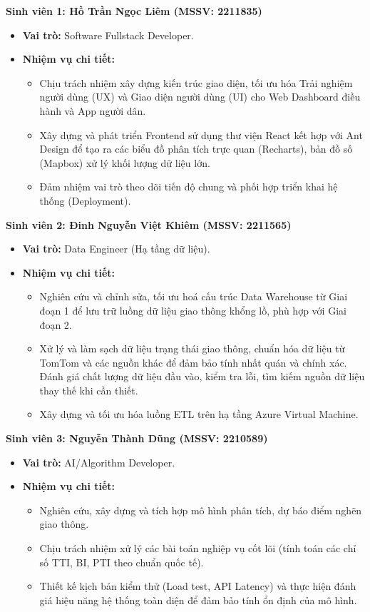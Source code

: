 \vspace{0.5cm}
\noindent\textbf{Sinh viên 1: Hồ Trần Ngọc Liêm (MSSV: 2211835)}
\begin{itemize}
    \item \textbf{Vai trò:} Software Fullstack Developer.
    \item \textbf{Nhiệm vụ chi tiết:}
    \begin{itemize}
        \item Chịu trách nhiệm xây dựng kiến trúc giao diện, tối ưu hóa Trải nghiệm người dùng (UX) và Giao diện người dùng (UI) cho Web Dashboard điều hành và App người dân.
        \item Xây dựng và phát triển Frontend sử dụng thư viện React kết hợp với Ant Design để tạo ra các biểu đồ phân tích trực quan (Recharts), bản đồ số (Mapbox) xử lý khối lượng dữ liệu lớn.
        \item Đảm nhiệm vai trò theo dõi tiến độ chung và phối hợp triển khai hệ thống (Deployment).
    \end{itemize}
\end{itemize}

\vspace{0.5cm}
\noindent\textbf{Sinh viên 2: Đinh Nguyễn Việt Khiêm (MSSV: 2211565)}
\begin{itemize}
    \item \textbf{Vai trò:} Data Engineer (Hạ tầng dữ liệu).
    \item \textbf{Nhiệm vụ chi tiết:}
    \begin{itemize}
        \item Nghiên cứu và chỉnh sửa, tối ưu hoá cấu trúc Data Warehouse từ Giai đoạn 1 để lưu trữ luồng dữ liệu giao thông khổng lồ, phù hợp với Giai đoạn 2.
        \item Xử lý và làm sạch dữ liệu trạng thái giao thông, chuẩn hóa dữ liệu từ TomTom và các nguồn khác để đảm bảo tính nhất quán và chính xác. Đánh giá chất lượng dữ liệu đầu vào, kiểm tra lỗi, tìm kiếm nguồn dữ liệu thay thế khi cần thiết.
        \item Xây dựng và tối ưu hóa luồng ETL trên hạ tầng Azure Virtual Machine.
    \end{itemize}
\end{itemize}

\vspace{0.5cm}
\noindent\textbf{Sinh viên 3: Nguyễn Thành Dũng (MSSV: 2210589)}
\begin{itemize}
    \item \textbf{Vai trò:} AI/Algorithm Developer.
    \item \textbf{Nhiệm vụ chi tiết:}
    \begin{itemize}
        \item Nghiên cứu, xây dựng và tích hợp mô hình phân tích, dự báo điểm nghẽn giao thông.
        \item Chịu trách nhiệm xử lý các bài toán nghiệp vụ cốt lõi (tính toán các chỉ số TTI, BI, PTI theo chuẩn quốc tế).
        \item Thiết kế kịch bản kiểm thử (Load test, API Latency) và thực hiện đánh giá hiệu năng hệ thống toàn diện để đảm bảo tính ổn định của mô hình.
    \end{itemize}
\end{itemize}

